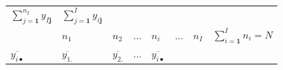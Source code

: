 \documentclass[]{book}
\theoremstyle{definition}
\theoremstyle{definition}
\theoremstyle{definition}
\theoremstyle{remark}
\begin{document}
\begin{longtable}[]{@{}llllllll@{}}
\begin{minipage}[t]{0.11\columnwidth}
\(\sum_{j = \mathbf{1}}^{n_{I}}y_{I\mathbf{j}}\)\strut
\end{minipage} & \begin{minipage}[t]{0.22\columnwidth}\raggedright
\(\sum_{j = \mathbf{1}}^{I}y_{i\mathbf{j}}\)\strut
\end{minipage}\tabularnewline
\begin{minipage}[t]{0.11\columnwidth}\raggedright
\strut
\end{minipage} & \begin{minipage}[t]{0.09\columnwidth}\raggedright
\(n_{1}\)\strut
\end{minipage} & \begin{minipage}[t]{0.09\columnwidth}\raggedright
\(n_{2}\)\strut
\end{minipage} & \begin{minipage}[t]{0.02\columnwidth}\raggedright
\(\ldots\)\strut
\end{minipage} & \begin{minipage}[t]{0.11\columnwidth}\raggedright
\(n_{i}\)\strut
\end{minipage} & \begin{minipage}[t]{0.02\columnwidth}\raggedright
\(\ldots\)\strut
\end{minipage} & \begin{minipage}[t]{0.11\columnwidth}\raggedright
\(n_{I}\)\strut
\end{minipage} & \begin{minipage}[t]{0.22\columnwidth}\raggedright
\(\sum_{i = \mathbf{1}}^{I}n_{i} = N\)\strut
\end{minipage}\tabularnewline
\begin{minipage}[t]{0.11\columnwidth}\raggedright
\(\overline{y_{i\bullet}}\)\strut
\end{minipage} & \begin{minipage}[t]{0.09\columnwidth}\raggedright
\(\overline{y_{1.}}\)\strut
\end{minipage} & \begin{minipage}[t]{0.09\columnwidth}\raggedright
\(\overline{y_{2.}}\)\strut
\end{minipage} & \begin{minipage}[t]{0.02\columnwidth}\raggedright
\(\ldots\)\strut
\end{minipage} & \begin{minipage}[t]{0.11\columnwidth}\raggedright
\(\overline{y_{i\bullet}}\)\strut
\end{minipage} & \begin{minipage}[t]{0.02\columnwidth}\raggedright

\end{minipage}
\end{longtable}
\end{document}
